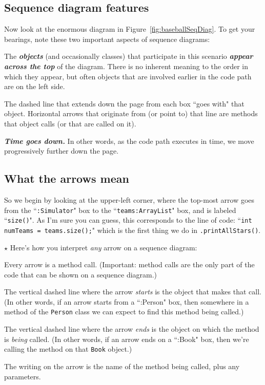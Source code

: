 \subsection{Sequence diagram features}

Now look at the enormous diagram in Figure~\ref{fig:baseballSeqDiag}. To get
your bearings, note these two important aspects of sequence diagrams:

\begin{compactitem}
\item The \textbf{\textit{objects}} (and occasionally classes) that
participate in this scenario \textbf{\textit{appear across the top}} of the
diagram. There is no inherent meaning to the order in which they appear, but
often objects that are involved earlier in the code path are on the left side.
\item The dashed line that extends down the page from each box ``goes with"
that object. Horizontal arrows that originate from (or point to) that line are
methods that object calls (or that are called on it).
\item \textit{\textbf{Time goes down.}} In other words, as the code path
executes in time, we move progressively further down the page.
\end{compactitem}

\subsection{What the arrows mean}

So we begin by looking at the upper-left corner, where the top-most arrow goes
from the ``\texttt{:Simulator}" box to the ``\texttt{teams:ArrayList}" box,
and is labeled ``\texttt{size()}". As I'm sure you can guess, this corresponds
to the line of code: ``\texttt{int numTeams = teams.size();}" which is the
first thing we do in \texttt{.printAllStars()}.

{\huge $\star$} Here's how you interpret \textit{any} arrow on a sequence diagram:

\begin{compactenum}
\item Every arrow is a method call. (Important: method calls are the
only part of the code that can be shown on a sequence diagram.)
\item The vertical dashed line where the arrow \textit{starts} is the object
that makes that call. (In other words, if an arrow starts from a ``:Person"
box, then somewhere in a method of the \texttt{Person} class we can expect to
find this method being called.)
\item The vertical dashed line where the arrow \textit{ends} is the object on
which the method is \textit{being} called. (In other words, if an arrow ends
on a ``:Book" box, then we're calling the method on that \texttt{Book}
object.)
\item The writing on the arrow is the name of the method being called, plus
any parameters.
\end{compactenum}

